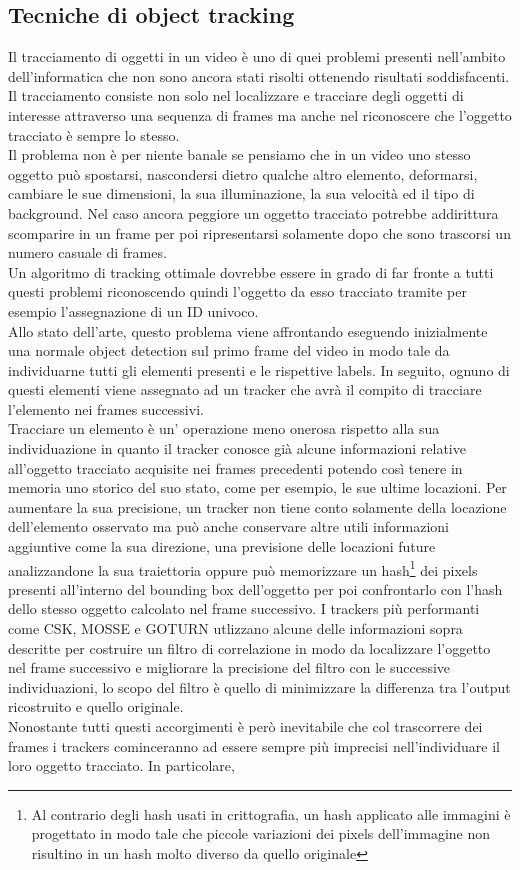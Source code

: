 \subsection{Tecniche di object tracking}
Il tracciamento di oggetti in un video è uno di quei problemi presenti nell'ambito dell'informatica che non sono ancora stati risolti ottenendo risultati soddisfacenti. Il tracciamento consiste non solo nel localizzare e tracciare degli oggetti di interesse attraverso una sequenza di frames ma anche nel riconoscere che l'oggetto tracciato è sempre lo stesso.\\ Il problema non è per niente banale se pensiamo che in un video uno stesso oggetto può spostarsi, nascondersi dietro qualche altro elemento, deformarsi, cambiare le sue dimensioni, la sua illuminazione, la sua velocità ed il tipo di background. Nel caso ancora peggiore un oggetto tracciato potrebbe addirittura scomparire in un frame per poi ripresentarsi solamente dopo che sono trascorsi un numero casuale di frames.\\ Un algoritmo di tracking ottimale dovrebbe essere in grado di far fronte a tutti questi problemi riconoscendo quindi l'oggetto da esso tracciato tramite per esempio l'assegnazione di un ID univoco.\\ Allo stato dell'arte, questo problema viene affrontando eseguendo inizialmente una normale object detection sul primo frame del video in modo tale da individuarne tutti gli elementi presenti e le rispettive labels. In seguito, ognuno di questi elementi viene assegnato ad un tracker che avrà il compito di tracciare l'elemento nei frames successivi.\\ Tracciare un elemento è un' operazione meno onerosa rispetto alla sua individuazione in quanto il tracker conosce già alcune informazioni relative all'oggetto tracciato acquisite nei frames precedenti potendo così tenere in memoria uno storico del suo stato, come per esempio, le sue ultime locazioni. Per aumentare la sua precisione, un tracker non tiene conto solamente della locazione dell'elemento  osservato ma può anche conservare altre utili informazioni aggiuntive come la sua direzione, una previsione delle locazioni future analizzandone la sua traiettoria oppure può memorizzare un hash\footnote{Al contrario degli hash usati in crittografia, un hash applicato alle immagini è progettato in modo tale che piccole variazioni dei pixels dell'immagine non risultino in un hash molto diverso da quello originale} dei pixels presenti all'interno del bounding box dell'oggetto per poi confrontarlo con l'hash dello stesso oggetto calcolato nel frame successivo. I trackers più performanti come CSK, MOSSE e GOTURN utlizzano alcune delle informazioni sopra descritte per costruire un filtro di correlazione in modo da localizzare l'oggetto nel frame successivo e migliorare la precisione del filtro con le successive individuazioni, lo scopo del filtro è quello di minimizzare la differenza tra l'output ricostruito e quello originale.\\ Nonostante tutti questi accorgimenti è però inevitabile che col trascorrere dei frames i trackers cominceranno ad essere sempre più imprecisi nell'individuare il loro oggetto tracciato. In particolare, 